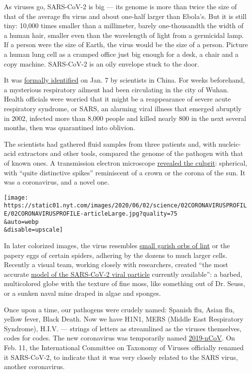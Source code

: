 As viruses go, SARS-CoV-2 is big --- its genome is more than twice the
size of that of the average flu virus and about one-half larger than
Ebola's. But it is still tiny: 10,000 times smaller than a millimeter,
barely one-thousandth the width of a human hair, smaller even than the
wavelength of light from a germicidal lamp. If a person were the size of
Earth, the virus would be the size of a person. Picture a human lung
cell as a cramped office just big enough for a desk, a chair and a copy
machine. SARS-CoV-2 is an oily envelope stuck to the door.

It was
\href{https://www.nytimes.com/2020/01/08/health/china-pneumonia-outbreak-virus.html}{formally
identified} on Jan. 7 by scientists in China. For weeks beforehand, a
mysterious respiratory ailment had been circulating in the city of
Wuhan. Health officials were worried that it might be a reappearance of
severe acute respiratory syndrome, or SARS, an alarming viral illness
that emerged abruptly in 2002, infected more than 8,000 people and
killed nearly 800 in the next several months, then was quarantined into
oblivion.

The scientists had gathered fluid samples from three patients and, with
nucleic-acid extractors and other tools, compared the genome of the
pathogen with that of known ones. A transmission electron microscope
\href{https://www.nejm.org/doi/full/10.1056/NEJMoa2001017}{revealed the
culprit}: spherical, with ``quite distinctive spikes'' reminiscent of a
crown or the corona of the sun. It was a coronavirus, and a novel one.

\texttt{[image: https://static01.nyt.com/images/2020/06/02/science/02CORONAVIRUSPROFILE/02CORONAVIRUSPROFILE-articleLarge.jpg?quality=75\\\&auto=webp\\\&disable=upscale]}

In later colorized images, the virus resembles
\href{https://www.youtube.com/watch?v=oBQvvCY2Mj0}{small garish orbs of
lint} or the papery eggs of certain spiders, adhering by the dozens to
much larger cells. Recently a visual team, working closely with
researchers, created ``the most accurate
\href{https://vimeo.com/417208044/758c67edaf}{model of the SARS-CoV-2
viral particle} currently available'': a barbed, multicolored globe with
the texture of fine moss, like something out of Dr. Seuss, or a sunken
naval mine draped in algae and sponges.

Once upon a time, our pathogens were crudely named: Spanish flu, Asian
flu, yellow fever, Black Death. Now we have H1N1, MERS (Middle East
Respiratory Syndrome), H.I.V. --- strings of letters as streamlined as
the viruses themselves, codes for codes. The new coronavirus was
temporarily named
\href{https://www.who.int/docs/default-source/coronaviruse/situation-reports/20200130-sitrep-10-ncov.pdf?sfvrsn=d0b2e480_2}{2019-nCoV}.
On Feb. 11, the International Committee on Taxonomy of Viruses
officially renamed it SARS-CoV-2, to indicate that it was very closely
related to the SARS virus, another coronavirus.

